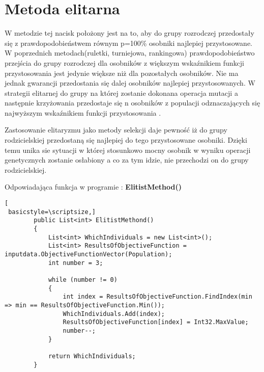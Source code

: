 
\section{Metoda elitarna}\label{sec:przygotowanieDokumentu}

W metodzie tej nacisk położony jest na to, aby do grupy rozrodczej przedostały się z prawdopodobieństwem równym p=100\% osobniki najlepiej przystosowane. W poprzednich metodach(ruletki, turniejowa, rankingowa) prawdopodobieństwo przejścia do grupy rozrodczej dla osobników z większym wskaźnikiem funkcji przystosowania jest jedynie większe niż dla pozostałych osobników. Nie ma jednak gwarancji przedostania się dalej osobników najlepiej przystosowanych. W strategii elitarnej do grupy na której zostanie dokonana operacja mutacji a następnie krzyżowania przedostaje się n osobników z populacji odznaczających się najwyższym wskaźnikiem funkcji przystosowania \cite{GPS}.\\
\par
Zastosowanie elitaryzmu jako metody selekcji daje pewność iż do grupy rodzicielskiej przedostaną się najlepiej do tego przystosowane osobniki. Dzięki temu unika sie sytuacji w której stosunkowo mocny osobnik w wyniku operacji genetycznych zostanie osłabiony a co za tym idzie, nie przechodzi on do grupy rodzicielskiej.\\
\par
Odpowiadająca funkcja w programie : \textbf{ElitistMethod()}

\begin{program}
\begin{lstlisting}[
 basicstyle=\scriptsize,]
        public List<int> ElitistMethond()
        {
            List<int> WhichIndividuals = new List<int>();
            List<int> ResultsOfObjectiveFunction = inputdata.ObjectiveFunctionVector(Population);
            int number = 3;

            while (number != 0)
            {
                int index = ResultsOfObjectiveFunction.FindIndex(min => min == ResultsOfObjectiveFunction.Min());
                WhichIndividuals.Add(index);
                ResultsOfObjectiveFunction[index] = Int32.MaxValue;
                number--;
            }

            return WhichIndividuals;
        }
\end{lstlisting}
\end{program}

